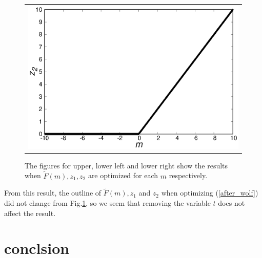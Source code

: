 \documentclass[fp,twocolumn]{jpsj3}
\begin{document}
\begin{figure}[htbp]
\begin{center}
\begin{tabular}{c}
\begin{minipage}{0.50\hsize}
      \end{minipage}
      \begin{minipage}{0.50\hsize}
        \centering
        \includegraphics[keepaspectratio,scale=0.33]{minimum_z2_non_t.eps}
      \end{minipage}
    \end{tabular}
    \caption{The figures for upper, lower left and lower right show the results when $\widetilde{F}(m), z_{1}, z_{2}$ are optimized for each $m$ respectively.}
    \label{fig:minimum2}
  \end{center}
\end{figure}
From this result, the outline of $\widetilde{F}(m), z_{1}$ and $z_{2}$ when optimizing (\ref{after_wolf}) did not change from Fig.\ref{fig:minimum2}, so we seem that removing the variable $t$ does not affect the result.

\section{conclsion}


\begin{acknowledgment}



\end{acknowledgment}

\end{document}
